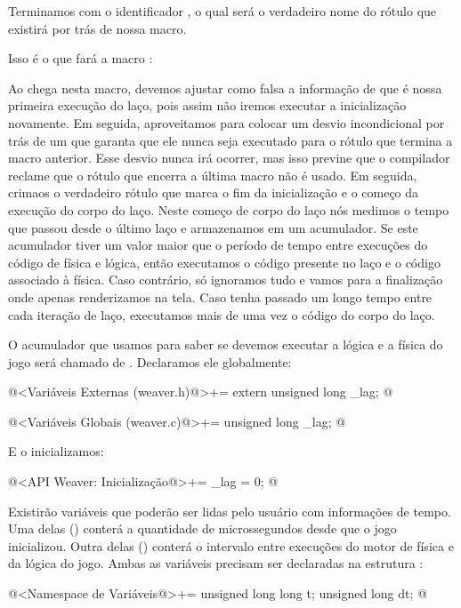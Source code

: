 Terminamos com o
identificador , o qual será
o verdadeiro nome do rótulo que existirá por trás de nossa macro.


Isso é o que fará a macro :

Ao chega nesta macro, devemos ajustar como falsa a informação de que é
nossa primeira execução do laço, pois assim não iremos executar a
inicialização novamente. Em seguida, aproveitamos para colocar um
desvio incondicional por trás de um  que garanta que
ele nunca seja executado para o rótulo que termina a macro
anterior. Esse desvio nunca irá ocorrer, mas isso previne que o
compilador reclame que o rótulo que encerra a última macro não é
usado. Em seguida, crimaos o verdadeiro rótulo que marca o fim da
inicialização e o começo da execução do corpo do laço. Neste começo de
corpo do laço nós medimos o tempo que passou desde o último laço e
armazenamos em um acumulador. Se este acumulador tiver um valor maior
que o período de tempo entre execuções do código de física e lógica,
então executamos o código presente no laço e o código associado à
física. Caso contrário, só ignoramos tudo e vamos para a finalização
onde apenas renderizamos na tela.  Caso tenha passado um longo tempo
entre cada iteração de laço, executamos mais de uma vez o código do
corpo do laço.

O acumulador que usamos para saber se devemos executar a lógica e a
física do jogo será chamado de . Declaramos ele
globalmente:

\iniciocodigo
@<Variáveis Externas (weaver.h)@>+=
extern unsigned long _lag;
@
\fimcodigo

\iniciocodigo
@<Variáveis Globais (weaver.c)@>+=
unsigned long _lag;
@
\fimcodigo

E o inicializamos:

\iniciocodigo
@<API Weaver: Inicialização@>+=
_lag = 0;
@
\fimcodigo

Existirão variáveis que poderão ser lidas pelo usuário com informações
de tempo. Uma delas () conterá a quantidade de
microssegundos desde que o jogo inicializou. Outra delas
() conterá o intervalo entre execuções do motor de
física e da lógica do jogo. Ambas as variáveis precisam ser declaradas
na estrutura :

\iniciocodigo
@<Namespace de Variáveis@>+=
unsigned long long t;
unsigned long dt;
@
\fimcodigo


